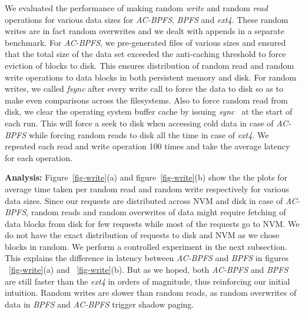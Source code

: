 We evaluated the performance of making random \textit{write} and random \textit{read} operations for various data sizes for \textit{AC-BPFS}, \textit{BPFS} and \textit{ext4}. These random writes are in fact random overwrites and we dealt with appends in a separate benchmark. For \textit{AC-BPFS}, we pre-generated files of various sizes and ensured that the total size of the data set exceeded the anti-caching threshold to force eviction of blocks to disk. This ensures distribution of random read and random write operations to data blocks in both persistent memory and disk. For random writes, we called \textit{fsync} after every write call to force the data to disk so as to make even comparisons across the filesystems. Also to force random read from disk, we clear the operating system buffer cache by issuing \textit{sync}~\cite{sync} at the start of each run. This will force a seek to disk when accessing cold data in case of \textit{AC-BPFS} while forcing random reads to disk all the time in case of \textit{ext4}. We repeated each read and write operation 100 times and take the average latency for each operation.

\textbf{Analysis:} Figure~\ref{fig-write}(a) and figure~\ref{fig-write}(b) show the the plots for average time taken per random read and random write respectively for various data sizes. Since our requests are distributed across NVM and disk in case of \textit{AC-BPFS}, random reads and random overwrites of data might require fetching of data blocks from disk for few requests while most of the requests go to NVM. We do not have the exact distribution of requests to disk and NVM as we chose blocks in random. We perform a controlled experiment in the next subsection. This explains the difference in latency between \textit{AC-BPFS} and \textit{BPFS} in figures ~\ref{fig-write}(a) and ~\ref{fig-write}(b). But as we hoped, both \textit{AC-BPFS} and \textit{BPFS} are still faster than the \textit{ext4} in orders of magnitude, thus reinforcing our initial intuition. Random writes are slower than random reads, as random overwrites of data in \textit{BPFS} and \textit{AC-BPFS} trigger shadow paging.

